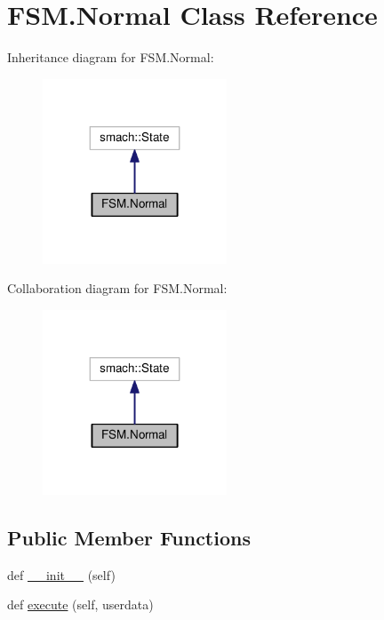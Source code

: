 \hypertarget{classFSM_1_1Normal}{}\section{F\+S\+M.\+Normal Class Reference}
\label{classFSM_1_1Normal}


Inheritance diagram for F\+S\+M.\+Normal\+:\nopagebreak
\begin{figure}[H]
\begin{center}
\leavevmode
\includegraphics[width=155pt]{classFSM_1_1Normal__inherit__graph}
\end{center}
\end{figure}


Collaboration diagram for F\+S\+M.\+Normal\+:\nopagebreak
\begin{figure}[H]
\begin{center}
\leavevmode
\includegraphics[width=155pt]{classFSM_1_1Normal__coll__graph}
\end{center}
\end{figure}
\subsection*{Public Member Functions}
\begin{DoxyCompactItemize}
\item 
def \hyperlink{classFSM_1_1Normal_a21e63c972c3a4b1417c60b5d18ea18bd}{\+\_\+\+\_\+init\+\_\+\+\_\+} (self)
\item 
def \hyperlink{classFSM_1_1Normal_ae85b3201d4649dac559f39d327f76f6e}{execute} (self, userdata)
\end{DoxyCompactItemize}
